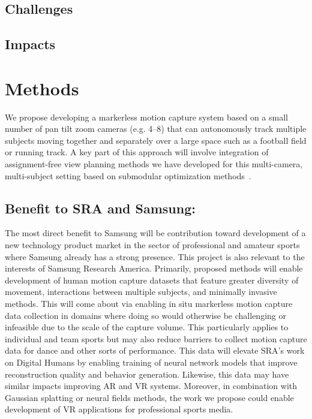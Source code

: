 \documentclass[11pt]{article}
\begin{document}
\subsection{Challenges}

\subsection{Impacts}

\section{Methods}

We propose developing a markerless motion capture system based on a small number
of pan tilt zoom cameras (e.g. 4--8) that can autonomously track multiple
subjects moving together and separately over a large space such as a football
field or running track.
A key part of this approach will involve integration of assignment-free view
planning methods we have developed for this multi-camera, multi-subject setting
based on submodular optimization methods~\citep{suresh2024iros,hughes2024cdc}.

\subsection{Benefit to SRA and Samsung:}

The most direct benefit to Samsung will be contribution toward development of a
new technology product market in the sector of professional and amateur sports
where Samsung already has a strong presence.
This project is also relevant to the interests of Samsung Research America.
Primarily, proposed methods will enable development of human motion capture
datasets that feature greater diversity of movement, interactions between
multiple subjects, and minimally invasive methods.
This will come about via enabling in situ markerless motion capture data
collection in domains where doing so would otherwise be challenging or
infeasible due to the scale of the capture volume.
This particularly applies to individual and team sports but may also reduce
barriers to collect motion capture data for dance and other sorts of
performance.
This data will elevate SRA's work on Digital Humans by enabling training of
neural network models that improve reconstruction quality and behavior
generation.
Likewise, this data may have similar impacts improving AR and VR systems.
Moreover, in combination with Gaussian splatting or neural fields methods, the
work we propose could enable development of VR applications for professional
sports media.
\end{document}
